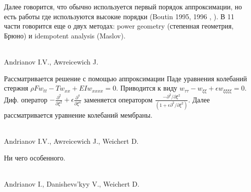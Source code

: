 \documentclass[12pt,a4paper]{article}
\begin{document}
Далее говорится, что обычно используется первый порядок аппроксимации, но есть работы где используются высокие порядки (Boutin 1995, 1996 \cite{Boutin1995}, \cite{Boutin1996}). В 11 части говорится еще о двух методах: power geometry (степенная геометрия, Брюно) и idempotent analysis (Maslov). 

~\\
\cite{Andrianov2007} Andrianov I.V., Awreicewich J.

Рассматривается решение с помощью аппроксимации Паде уравнения колебаний стержня $\rho F w_{tt}-Tw_{xx}+EIw_{xxxx}=0$. Приводится к виду $w_{\tau \tau}-w_{\xi \xi}+\epsilon w_{\xi\xi\xi\xi}=0$. Диф. оператор
$-\frac{\partial^2}{\partial\xi^2}+\epsilon \frac{\partial^4}{\partial\xi^4}$ заменяется оператором
 $\frac{-\partial^2/\partial\xi^2}{(1+\epsilon\partial^2/\partial\xi^2)}$. Далее рассматривается уравнение колебаний мембраны.

~\\
\cite{Andrianov2010} Andrianov I.V., Awreicewich J., Weichert D.

Ни чего особенного.

~\\
\cite{Andrianov2002} Andrianov I., Danishevs’kyy V., Weichert D.
\end{document}
